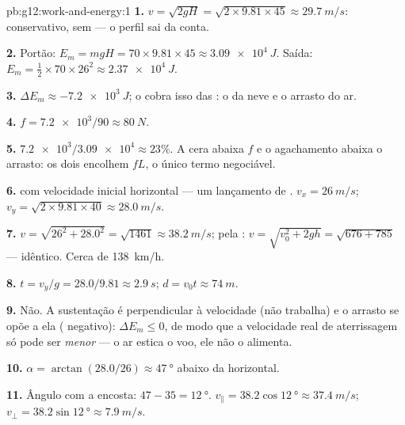 \begin{solution}{pb:g12:work-and-energy:1}
\textbf{1.} $v = \sqrt{2gH} = \sqrt{2 \times 9.81 \times 45} \approx
\qty{29.7}{m/s}$:  conservativo,  sem  --- o
perfil sai da conta.

\textbf{2.} Portão: $E_m = mgH = 70 \times 9.81 \times 45 \approx
\qty{3.09e4}{J}$. Saída: $E_m = \tfrac12 \times 70 \times 26^2 \approx
\qty{2.37e4}{J}$.

\textbf{3.} $\Delta E_m \approx \qty{-7.2e3}{J}$; o  cobra isso das : o  da neve e o
arrasto do ar.

\textbf{4.} $f = \num{7.2e3}/90 \approx \qty{80}{N}$.

\textbf{5.} $\num{7.2e3}/\num{3.09e4} \approx 23\%$. A cera abaixa $f$ e
o agachamento abaixa o arrasto: os dois encolhem $fL$, o único termo
negociável.

\textbf{6.}  com velocidade inicial horizontal --- um
lançamento de . $v_x = \qty{26}{m/s}$;
$v_y = \sqrt{2 \times 9.81 \times 40} \approx \qty{28.0}{m/s}$.

\textbf{7.} $v = \sqrt{26^2 + 28.0^2} = \sqrt{1461} \approx
\qty{38.2}{m/s}$; pela : $v = \sqrt{v_0^2 + 2gh} =
\sqrt{676 + 785}$ --- idêntico. Cerca de \qty{138}{km/h}.

\textbf{8.} $t = v_y/g = 28.0/9.81 \approx \qty{2.9}{s}$;
$d = v_0 t \approx \qty{74}{m}$.

\textbf{9.} Não. A sustentação é perpendicular à velocidade (não
trabalha) e o arrasto se opõe a ela ( negativo):
$\Delta E_m \leq 0$, de modo que a velocidade real de aterrissagem só
pode ser \emph{menor} --- o ar estica o voo, ele não o alimenta.

\textbf{10.} $\alpha = \arctan(28.0/26) \approx \qty{47}{\degree}$ abaixo
da horizontal.

\textbf{11.} Ângulo com a encosta: $47 - 35 = \qty{12}{\degree}$.
$v_\parallel = 38.2\cos\qty{12}{\degree} \approx \qty{37.4}{m/s}$;
$v_\perp = 38.2\sin\qty{12}{\degree} \approx \qty{7.9}{m/s}$.


\end{solution}
